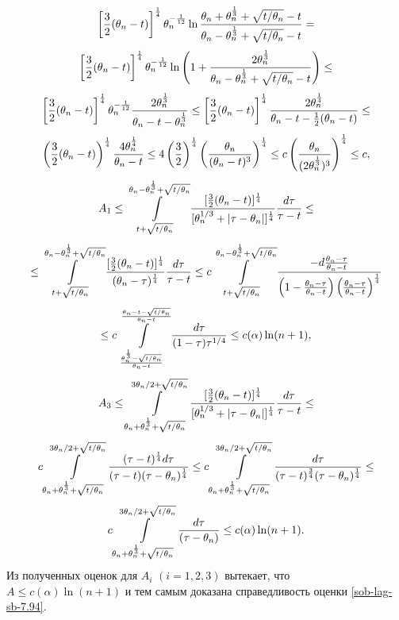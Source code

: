 $$
\left[\frac32(\theta_n-t)\right]^\frac14\theta_n^{-\frac1{12}}\ln {\theta_n+\theta_n^\frac13+\sqrt{t/\theta_n}-t\over\theta_n-\theta_n^\frac13+
\sqrt{t/\theta_n}-t}=
$$
$$
\left[\frac32(\theta_n-t)\right]^\frac14\theta_n^{-\frac1{12}}\ln\left(1+ {2\theta_n^\frac13\over\theta_n-\theta_n^\frac13+\sqrt{t/\theta_n}-t}\right)\le
$$
$$
\left[\frac32(\theta_n-t)\right]^\frac14\theta_n^{-\frac1{12}}
{2\theta_n^\frac13\over\theta_n-t-\theta_n^\frac13}\le
\left[\frac32(\theta_n-t)\right]^\frac14{2\theta_n^\frac14\over\theta_n-t-\frac12(\theta_n-t)}
\le
$$
$$
\left(\frac32(\theta_n-t)\right)^\frac14{4\theta_n^\frac14\over\theta_n-t}\le 4\left(\frac32\right)^\frac14
\left({\theta_n\over(\theta_n-t)^3}\right)^\frac14\le c\left({\theta_n\over(2\theta_n^\frac13)^3}\right)^\frac14\le c,
$$
$$
A_1\le\int\limits_{t+\sqrt{t/\theta_n}}^{\theta_n-\theta_n^\frac13+\sqrt{t/\theta_n}}
{[\frac32(\theta_n-t)]^\frac14\over[\theta_n^{1/3}+|\tau-\theta_n|]^\frac14} {d\tau\over \tau-t}\le
$$
$$
\le\int\limits_{t+\sqrt{t/\theta_n}}^{\theta_n-\theta_n^\frac13+\sqrt{t/\theta_n}}
{[\frac32(\theta_n-t)]^\frac14\over(\theta_n-\tau)^\frac14} {d\tau\over \tau-t}\le
c\int\limits_{t+\sqrt{t/\theta_n}}^{\theta_n-\theta_n^\frac13+\sqrt{t/\theta_n}}
{-d{\theta_n-\tau\over\theta_n-t}
\over\left(1-{\theta_n-\tau\over\theta_n-t}\right)
\left({\theta_n-\tau\over\theta_n-t}\right)^\frac14}
$$
$$
\le c\int\limits^{\theta_n-t-\sqrt{t/\theta_n}\over
\theta_n-t}_{\theta_n^\frac13-\sqrt{t/\theta_n}\over\theta_n-t}{d\tau\over(1-\tau)\tau^{1/4}}
\le c(\alpha)\ln(n+1),
$$
$$
A_3\le\int\limits^{3\theta_n/2+\sqrt{t/\theta_n}}_{\theta_n+\theta_n^\frac13+\sqrt{t/\theta_n}}
{[\frac32(\theta_n-t)]^\frac14\over[\theta_n^{1/3}+|\tau-\theta_n|]^\frac14} {d\tau\over \tau-t}\le
$$
$$
c\int\limits^{3\theta_n/2+\sqrt{t/\theta_n}}_{\theta_n+\theta_n^\frac13+\sqrt{t/\theta_n}}
{(\tau-t)^\frac14d\tau\over(\tau-t)(\tau-\theta_n)^\frac14}\le
c\int\limits^{3\theta_n/2+\sqrt{t/\theta_n}}_{\theta_n+\theta_n^\frac13+\sqrt{t/\theta_n}}
{d\tau\over(\tau-t)^{\frac34}(\tau-\theta_n)^\frac14}\le
$$
$$
c\int\limits^{3\theta_n/2+
\sqrt{t/\theta_n}}_{\theta_n+\theta_n^\frac13+\sqrt{t/\theta_n}}
{d\tau\over(\tau-\theta_n)}\le c(\alpha)\ln(n+1).
$$
Из полученных оценок для $A_i$ $(i=1,2,3)$ вытекает, что $A\le c(\alpha)\ln(n+1)$ и тем самым доказана справедливость оценки \eqref{sob-lag-sb-7.94}.

